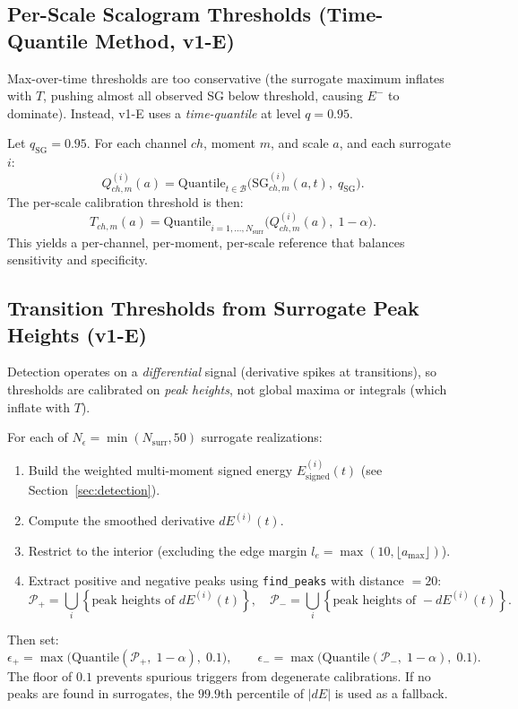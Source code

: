 \documentclass{article}
\begin{document}
\subsection{Per-Scale Scalogram Thresholds (Time-Quantile Method, v1-E)}
Max-over-time thresholds are too conservative (the surrogate maximum inflates with $T$, pushing
almost all observed SG below threshold, causing $E^{-}$ to dominate). Instead, v1-E uses a
\emph{time-quantile} at level $q = 0.95$.

Let $q_{\mathrm{SG}} = 0.95$. For each channel $ch$, moment $m$, and scale $a$, and each surrogate $i$:
\[
Q_{ch,m}^{(i)}(a) = \mathrm{Quantile}_{t\in\mathcal{B}}\!\Big(\mathrm{SG}_{ch,m}^{(i)}(a,t),\; q_{\mathrm{SG}}\Big).
\]
The per-scale calibration threshold is then:
\[
T_{ch,m}(a) = \mathrm{Quantile}_{i=1,\dots,N_{\mathrm{surr}}}\!\Big(Q_{ch,m}^{(i)}(a),\; 1-\alpha\Big).
\]
This yields a per-channel, per-moment, per-scale reference that balances sensitivity and specificity.

\subsection{Transition Thresholds from Surrogate Peak Heights (v1-E)}
Detection operates on a \emph{differential} signal (derivative spikes at transitions), so thresholds
are calibrated on \emph{peak heights}, not global maxima or integrals (which inflate with $T$).

For each of $N_\epsilon = \min(N_{\mathrm{surr}}, 50)$ surrogate realizations:
\begin{enumerate}
  \item Build the weighted multi-moment signed energy $E_{\mathrm{signed}}^{(i)}(t)$ (see Section~\ref{sec:detection}).
  \item Compute the smoothed derivative $dE^{(i)}(t)$.
  \item Restrict to the interior (excluding the edge margin $l_e = \max(10, \lfloor a_{\max}\rfloor)$).
  \item Extract positive and negative peaks using \texttt{find\_peaks} with distance $= 20$:
  \[
    \mathcal{P}_+ = \bigcup_i \!\left\{\text{peak heights of } dE^{(i)}(t)\right\},\quad
    \mathcal{P}_- = \bigcup_i \!\left\{\text{peak heights of } -dE^{(i)}(t)\right\}.
  \]
\end{enumerate}
Then set:
\[
\epsilon_+ = \max\!\Big(\mathrm{Quantile}(\mathcal{P}_+,\; 1-\alpha),\; 0.1\Big),\qquad
\epsilon_- = \max\!\Big(\mathrm{Quantile}(\mathcal{P}_-,\; 1-\alpha),\; 0.1\Big).
\]
The floor of $0.1$ prevents spurious triggers from degenerate calibrations. If no peaks are found
in surrogates, the $99.9$th percentile of $|dE|$ is used as a fallback.
\end{document}
